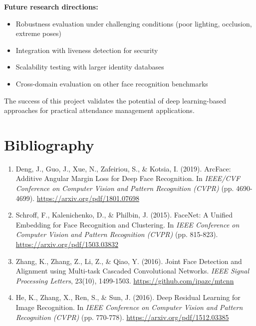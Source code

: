 \documentclass[sommairechap,stylejchiquet]{these_gi}
\begin{document}
\textbf{Future research directions:}
\begin{itemize}
    \item Robustness evaluation under challenging conditions (poor lighting, occlusion, extreme poses)
    \item Integration with liveness detection for security
    \item Scalability testing with larger identity databases
    \item Cross-domain evaluation on other face recognition benchmarks
\end{itemize}

The success of this project validates the potential of deep learning-based approaches for practical attendance management applications.

\chapter*{Bibliography}

\begin{enumerate}
    \item Deng, J., Guo, J., Xue, N., Zafeiriou, S., \& Kotsia, I. (2019). ArcFace: Additive Angular Margin Loss for Deep Face Recognition. In \textit{IEEE/CVF Conference on Computer Vision and Pattern Recognition (CVPR)} (pp. 4690-4699). \url{https://arxiv.org/pdf/1801.07698}
    \item Schroff, F., Kalenichenko, D., \& Philbin, J. (2015). FaceNet: A Unified Embedding for Face Recognition and Clustering. In \textit{IEEE Conference on Computer Vision and Pattern Recognition (CVPR)} (pp. 815-823). \url{https://arxiv.org/pdf/1503.03832}
    \item Zhang, K., Zhang, Z., Li, Z., \& Qiao, Y. (2016). Joint Face Detection and Alignment using Multi-task Cascaded Convolutional Networks. \textit{IEEE Signal Processing Letters}, 23(10), 1499-1503. \url{https://github.com/ipazc/mtcnn}
    \item He, K., Zhang, X., Ren, S., \& Sun, J. (2016). Deep Residual Learning for Image Recognition. In \textit{IEEE Conference on Computer Vision and Pattern Recognition (CVPR)} (pp. 770-778). \url{https://arxiv.org/pdf/1512.03385}
\end{enumerate}
\end{document}
